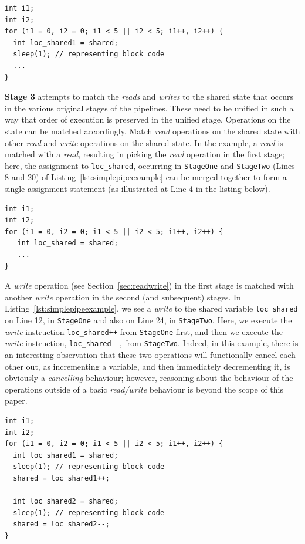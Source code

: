 \begin{lstlisting}[frame=single]
int i1;
int i2;
for (i1 = 0, i2 = 0; i1 < 5 || i2 < 5; i1++, i2++) {
  int loc_shared1 = shared;
  sleep(1); // representing block code
  ...
}
\end{lstlisting}
\noindent
\textbf{Stage 3} attempts to match the \emph{reads} and \emph{writes} to the shared state that occurs in the various original stages of the pipelines. These need to be unified in such a way that order of execution is preserved in the unified stage. Operations on the state can be matched accordingly. Match \emph{read} operations on the shared state with other \emph{read} and \emph{write} operations on the shared state. In the example, a \emph{read} is matched with a \emph{read}, resulting in picking the \emph{read} operation in the first stage; here, the assignment to \lstinline|loc_shared|, occurring in \lstinline|StageOne| and \lstinline|StageTwo| (Lines 8 and 20) of Listing~\ref{lst:simplepipeexample} can be merged together to form a single assignment statement (as illustrated at Line 4 in the listing below).
\begin{lstlisting}[frame=single]
int i1;
int i2;
for (i1 = 0, i2 = 0; i1 < 5 || i2 < 5; i1++, i2++) {
   int loc_shared = shared;
   ...
}
\end{lstlisting}

\noindent
A \emph{write} operation (see Section~\ref{sec:readwrite}) in the first stage is matched with another \emph{write} operation in the second (and subsequent) stages. In Listing~\ref{lst:simplepipeexample}, we see a \emph{write} to the shared variable \lstinline|loc_shared| on Line 12, in \lstinline|StageOne| and also on Line 24, in \lstinline|StageTwo|. Here, we execute the \emph{write} instruction \lstinline|loc_shared++| from \lstinline|StageOne| first, and then we execute the \emph{write} instruction, \lstinline|loc_shared--|, from \lstinline|StageTwo|. Indeed, in this example, there is an interesting observation that these two operations will functionally cancel each other out, as incrementing a variable, and then immediately decrementing it, is obviously a \emph{cancelling} behaviour; however, reasoning about the behaviour of the operations outside of a basic \emph{read/write} behaviour is beyond the scope of this paper.

  \begin{lstlisting}[frame=single]
int i1;
int i2;
for (i1 = 0, i2 = 0; i1 < 5 || i2 < 5; i1++, i2++) {
  int loc_shared1 = shared;
  sleep(1); // representing block code
  shared = loc_shared1++;

  int loc_shared2 = shared;
  sleep(1); // representing block code
  shared = loc_shared2--;
}
\end{lstlisting}

